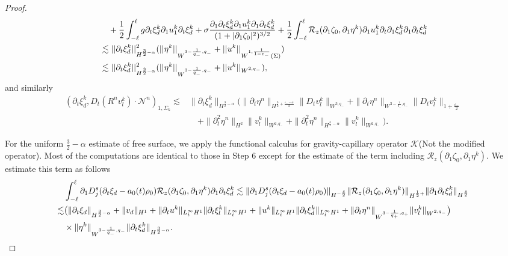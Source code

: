 \documentclass[letterpaper,reqno,10pt,twoside]{amsart}
\theoremstyle{definition}
\theoremstyle{remark}
\def\p{\partial}
\begin{document}
\begin{proof}
\begin{align}
			&\quad+\frac{1}{2}\int_{-\ell}^{\ell}g\partial_{t}\xi_{d}^{k}\partial_{1}u_{1}^{k}\partial_{t}\xi_{d}^{k}+\sigma\frac{\p_1\partial_{t}\xi_{d}^{k}\partial_{1}u_{1}^{k}\partial_{1}\partial_{t}\xi_{d}^{k}}{(1+|\p_1\zeta_0|^2)^{3/2}}+\frac{1}{2}\int_{-\ell}^{\ell}\mathcal{R}_{z}(\partial_{1}\zeta_{0},\partial_{1}\eta^{k})\partial_{1}u_{1}^{k}\partial_{t}\partial_{1}\xi_{d}^{k}\partial_{1}\partial_{t}\xi_{d}^{k}\notag\\
			&\lesssim \vert \vert \partial_{t}\xi_{d}^{k}\vert \vert^{2}_{H^{\frac{3}{2}-\alpha}}(\vert \vert \eta^{k}\vert \vert_{W^{3-\frac{1}{q_{-}},q_{-}}}+\vert \vert u^{k}\vert\vert_{W^{1,\frac{1}{1-\varepsilon_{-}}}(\Sigma)}) \notag\\
			&\lesssim \vert \vert \partial_{t}\xi_{d}^{k}\vert \vert^{2}_{H^{\frac{3}{2}-\alpha}}(\vert \vert \eta^{k}\vert \vert_{W^{3-\frac{1}{q_{-}},q_{-}}}+\vert \vert u^{k}\vert\vert_{W^{2,q_{-}}}), \label{eq:n4}
		\end{align}
		and similarly
		\[
		\begin{aligned}
			(\partial_{t}\xi_{d}^{k},D_{t}(R^{n}v_{l}^{k})\cdot \mathcal{N}^{n})_{1,\Sigma_{k}}\lesssim &\|\p_{t}\xi_{d}^{k}\|_{H^{\frac{3}{2}-\alpha}}(\|\p_{t}\eta^{n}\|_{H^{\frac{3}{2}+\frac{\varepsilon_{-}-\alpha}{2}}}\|D_{t}v_{l}^{k}\|_{W^{2,q_{-}}}+\|\p_{t}\eta^{n}\|_{W^{3-\frac{1}{q_{-}},q_{-}}}\|D_{t}v_{l}^{k}\|_{1+\frac{\varepsilon_{-}}{2}}\\
			&\quad +\|\p_{t}^{2}\eta^{n}\|_{H^{2}}\|v_{l}^{k}\|_{W^{2,q_{-}}}+\|\p_{t}^{2}\eta^{n}\|_{H^{\frac{3}{2}-\alpha}}\|v_{l}^{k}\|_{W^{2,q_{-}}}).
		\end{aligned}
		\]
		
		For the uniform $\frac{3}{2}-\alpha$ estimate of free surface, we apply the functional calculus for gravity-capillary operator $\mathcal{K}$(Not the modified operator). Most of the computations are identical to those in Step 6 except for the estimate of the term including $\mathcal{R}_{z}(\p_{1}\zeta_{0},\p_{1}\eta^{k})$. We estimate this term as follows
		\begin{align}{\label{eq:n5}}
			\begin{aligned}
				&\int_{-\ell}^{\ell}\p_{1}D_{j}^{s}(\p_{t}\xi_{d}-a_{0}(t)\rho_{0})\mathcal{R}_{z}(\p_{1}\zeta_{0},\p_{1}\eta^{k})\p_{1}\p_{t}\xi_{d}^{k}\lesssim \|\p_{1}D_{j}^{s}(\p_{t}\xi_{d}-a_{0}(t)\rho_{0})\|_{H^{-\frac{s}{2}}}\|\mathcal{R}_{z}(\p_{1}\zeta_{0},\p_{1}\eta^{k})\|_{H^{\frac{1}{2}+}}\|\p_{1}\p_{t}\xi_{d}^{k}\|_{H^{\frac{s}{2}}}\\
				\lesssim& \big(\|\p_{t}\xi_{d}\|_{H^{\frac{3}{2}-\alpha}}+\|v_{d}\|_{H^{1}}+\|\p_{t}u^{k}\|_{L_{t}^{\infty}H^{1}}\|\p_{t}\xi_{l}^{k}\|_{L_{t}^{\infty}H^{1}}
				+\|u^{k}\|_{L_{t}^{\infty}H^{1}}\|\p_{t}\xi_{d}^{k}\|_{L_{t}^{\infty}H^{1}}+\|\p_{t}\eta^{n}\|_{W^{3-\frac{1}{q_{+}},q_{+}}}\|v_{l}^{k}\|_{W^{2,q_{-}}}\big)\\
				&
				\times\|\eta^{k}\|_{W^{3-\frac{1}{q_{-}},q_{-}}}\|\p_{t}\xi_{d}^{k}\|_{H^{\frac{3}{2}-\alpha}}.
			\end{aligned}
		\end{align}
		

\end{proof}
\end{document}
